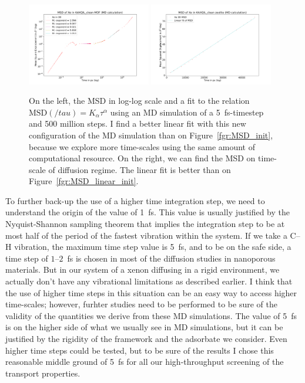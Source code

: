 \documentclass[main]{subfiles}
\begin{document}
\begin{figure}[ht]
  \centering
  \includegraphics[width=0.48\textwidth]{figures/5-diffusion/MSD_Xe_KAXQIL_clean_5fs.pdf}
  \includegraphics[width=0.48\textwidth]{figures/5-diffusion/MSD_Xe_coeff_KAXQIL_clean_5fs.pdf}
\caption{ On the left, the MSD in log-log scale and a fit to the relation $\text{MSD}(/tau) = K_\alpha\tau^\alpha$ using an MD simulation of a \SI{5}{\fs}-timestep and 500 million steps. I find a better linear fit with this new configuration of the MD simulation than on Figure~\ref{fgr:MSD_init}, because we explore more time-scales using the same amount of computational resource. On the right, we can find the MSD on time-scale of diffusion regime. The linear fit is better than on Figure~\ref{fgr:MSD_linear_init}.}\label{fgr:MSD_5fs}
\end{figure}

To further back-up the use of a higher time integration step, we need to understand the origin of the value of \SI{1}{\fs}. This value is usually justified by the Nyquist-Shannon sampling theorem that implies the integration step to be at most half of the period of the fastest vibration within the system. If we take a C--H vibration, the maximum time step value is \SI{5}{\fs}, and to be on the safe side, a time step of $1$--$2$~\si{\fs} is chosen in most of the diffusion studies in nanoporous materials.\autocite{Bukowski_2021} But in our system of a xenon diffusing in a rigid environment, we actually don't have any vibrational limitations as described earlier. I think that the use of higher time steps in this situation can be an easy way to access higher time-scales; however, furhter studies need to be performed to be sure of the validity of the quantities we derive from these MD simulations. The value of \SI{5}{\fs} is on the higher side of what we usually see in MD simulations, but it can be justified by the rigidity of the framework and the adsorbate we consider. Even higher time steps could be tested, but to be sure of the results I chose this reasonable middle ground of \SI{5}{\fs} for all our high-throughput screening of the transport properties.
\end{document}
